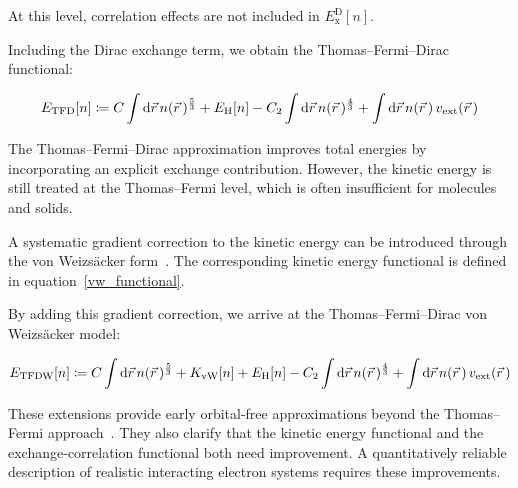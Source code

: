 At this level, correlation effects are not included in $E_\mathrm{x}^\mathrm{D}[n]$.

Including the Dirac exchange term,
we obtain the Thomas--Fermi--Dirac functional:

\begin{equation}
    E_\mathrm{TFD}[n]
    \coloneqq C\int\mathrm{d}{\vec{r}}\,n(\vec{r}\,)^{\frac{5}{3}}
    + E_\mathrm{H}[n]
    - C_2\int\mathrm{d}{\vec{r}}\,n(\vec{r}\,)^{\frac{4}{3}}
    + \int\mathrm{d}{\vec{r}}\,n(\vec{r}\,)\,v_\mathrm{ext}(\vec{r}\,)
\label{TFD_functional}
\end{equation}

The Thomas--Fermi--Dirac approximation improves total energies by incorporating an explicit exchange contribution.
However, the kinetic energy is still treated at the Thomas--Fermi level, which is often insufficient for molecules and solids.

A systematic gradient correction to the kinetic energy can be introduced through the von Weizsäcker form~\cite{yang1986gradient}.
The corresponding kinetic energy functional is defined in equation~\eqref{vw_functional}.

By adding this gradient correction, we arrive at the Thomas--Fermi--Dirac von Weizsäcker model:

\begin{equation}
    E_\mathrm{TFDW}[n]
    \coloneqq C\int\mathrm{d}{\vec{r}}\,n(\vec{r}\,)^{\frac{5}{3}}
    + K_\mathrm{vW}[n]
    + E_\mathrm{H}[n]
    - C_2\int\mathrm{d}{\vec{r}}\,n(\vec{r}\,)^{\frac{4}{3}}
    + \int\mathrm{d}{\vec{r}}\,n(\vec{r}\,)\,v_\mathrm{ext}(\vec{r}\,)
\label{TFDW_functional}
\end{equation}

These extensions provide early orbital-free approximations beyond the Thomas--Fermi approach~\cite{lieb1981thomas}.
They also clarify that the kinetic energy functional and the exchange-correlation functional both need improvement.
A quantitatively reliable description of realistic interacting electron systems requires these improvements.
